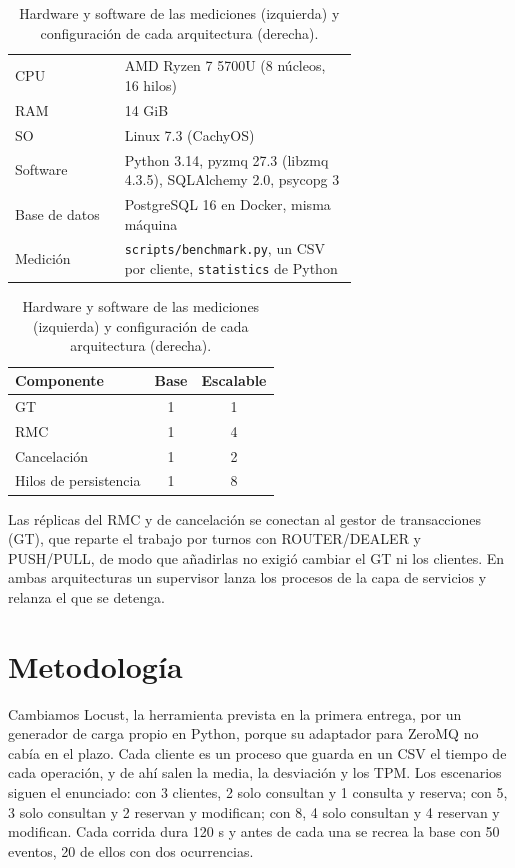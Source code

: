 \documentclass[10pt, a4paper]{article}
\begin{document}
	\begin{table}[H]
		\centering\small
		\begin{minipage}[t]{0.56\textwidth}
			\centering
			\begin{tabular}{@{}lp{0.68\linewidth}@{}}
				\toprule
				CPU & AMD Ryzen 7 5700U (8 núcleos, 16 hilos) \\
				RAM & 14 GiB \\
				SO & Linux 7.3 (CachyOS) \\
				Software & Python 3.14, pyzmq 27.3 (libzmq 4.3.5), SQLAlchemy 2.0, psycopg 3 \\
				Base de datos & PostgreSQL 16 en Docker, misma máquina \\
				Medición & \texttt{scripts/benchmark.py}, un CSV por cliente, \texttt{statistics} de Python \\
				\bottomrule
			\end{tabular}
		\end{minipage}\hfill
		\begin{minipage}[t]{0.40\textwidth}
			\centering
			\begin{tabular}{@{}lcc@{}}
				\toprule
				Componente & Base & Escalable \\
				\midrule
				GT & 1 & 1 \\
				RMC & 1 & 4 \\
				Cancelación & 1 & 2 \\
				Hilos de persistencia & 1 & 8 \\
				\bottomrule
			\end{tabular}
		\end{minipage}
		\caption{Hardware y software de las mediciones (izquierda) y configuración de cada arquitectura (derecha).}
		\label{tab:entorno}
	\end{table}

	Las réplicas del RMC y de cancelación se conectan al gestor de transacciones (GT), que reparte el trabajo por turnos con ROUTER/DEALER y PUSH/PULL, de modo que añadirlas no exigió cambiar el GT ni los clientes. En ambas arquitecturas un supervisor lanza los procesos de la capa de servicios y relanza el que se detenga.

	\section{Metodología}
	\label{sec:metodo}

	Cambiamos Locust, la herramienta prevista en la primera entrega, por un generador de carga propio en Python, porque su adaptador para ZeroMQ no cabía en el plazo. Cada cliente es un proceso que guarda en un CSV el tiempo de cada operación, y de ahí salen la media, la desviación y los TPM. Los escenarios siguen el enunciado: con 3 clientes, 2 solo consultan y 1 consulta y reserva; con 5, 3 solo consultan y 2 reservan y modifican; con 8, 4 solo consultan y 4 reservan y modifican. Cada corrida dura 120 s y antes de cada una se recrea la base con 50 eventos, 20 de ellos con dos ocurrencias.
\end{document}
